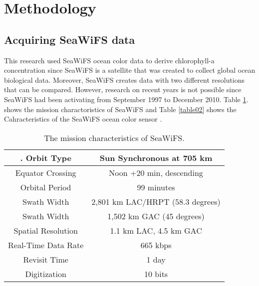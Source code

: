 \section{Methodology}

\subsection{Acquiring SeaWiFS data}

 This research used SeaWiFS ocean color data to derive chlorophyll-a concentration since SeaWiFS is a satellite that was created to collect global ocean biological data. Moreover, SeaWiFS creates data with two different resolutions that can be compared. However, research on recent years is not possible since SeaWiFS had been activating from September 1997 to December 2010. {Table \ref{table01}.} shows the mission charactoristics of SeaWiFS and Table \ref{table02} shows the Cahracteristics of the SeaWiFS ocean color sensor \cite{hooker1992An}.

 \begin{table}[h]\textwidth
 	\caption{The mission characteristics of SeaWiFS.}
 	\label{table01}
 	\centering
 	\begin{tabular}{c|c}
 		\hline \setlength{\arrayrulewidth}{0.8pt}. 
 	Orbit Type	& Sun Synchronous at 705 km \\ \hline
 	Equator Crossing &	Noon +20 min, descending \\ \hline
 	Orbital Period &	99 minutes  \\ \hline
 	Swath Width &	2,801 km LAC/HRPT (58.3 degrees)  \\ \hline
 	Swath Width &	1,502 km GAC (45 degrees)  \\ \hline
 	Spatial Resolution &	1.1 km LAC, 4.5 km GAC  \\ \hline
 	Real-Time Data Rate &	665 kbps  \\ \hline
 	Revisit Time &	1 day  \\ \hline
 	Digitization &	10 bits  \\ \hline
 	\end{tabular}
 \end{table}

